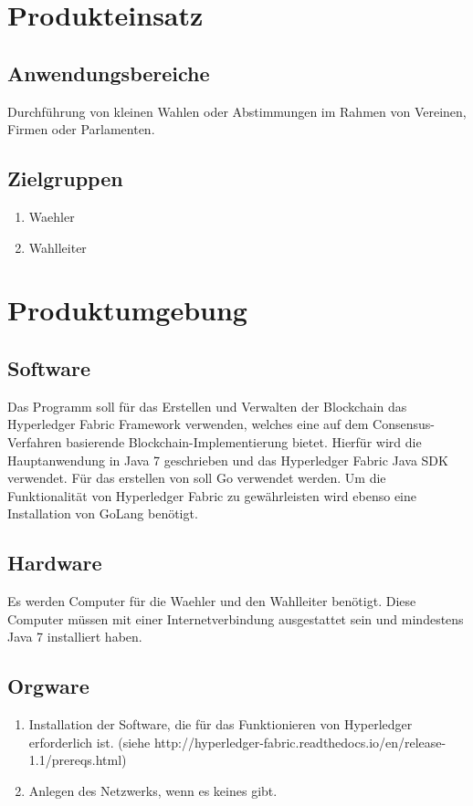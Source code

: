 \documentclass[parskip=full,11pt,twoside]{scrartcl}
\begin{document}
\section{Produkteinsatz}

\subsection{Anwendungsbereiche}
Durchführung von kleinen Wahlen oder Abstimmungen im Rahmen von Vereinen, Firmen oder Parlamenten.

\subsection{Zielgruppen}
\begin{enumerate}
  \item \gls{Waehler}
  \item \gls{Wahlleiter}
\end{enumerate}

\section{Produktumgebung}

\subsection{Software}
Das Programm soll für das Erstellen und Verwalten der \gls{Blockchain} das Hyperledger Fabric Framework verwenden, welches eine auf dem Consensus-Verfahren basierende Blockchain-Implementierung bietet.
Hierfür wird die Hauptanwendung in Java 7 geschrieben und das Hyperledger Fabric Java SDK verwendet. Für das erstellen von  soll Go verwendet werden.
Um die Funktionalität von Hyperledger Fabric zu gewährleisten wird ebenso eine Installation von GoLang benötigt.

\subsection{Hardware}
Es werden Computer für die \gls{Waehler} und den \gls{Wahlleiter} benötigt. Diese Computer müssen mit einer Internetverbindung ausgestattet sein und mindestens Java 7 installiert haben.

\subsection{Orgware}
\begin{enumerate}
\item Installation der Software, die für das Funktionieren von Hyperledger erforderlich ist. (siehe http://hyperledger-fabric.readthedocs.io/en/release-1.1/prereqs.html)
\item Anlegen des Netzwerks, wenn es keines gibt.
\end{enumerate}
\end{document}

